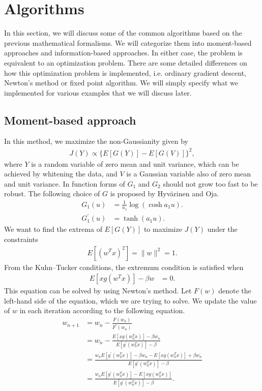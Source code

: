 \documentclass[aps,prl,preprint,superscriptaddress]{revtex4-2}
\begin{document}
\section{Algorithms}
In this section, we will discuss some of the common algorithms based on the previous mathematical formalisms. We will categorize them into moment-based approaches and information-based approaches. In either case, the problem is equivalent to an optimization problem. There are some detailed differences on how this optimization problem is implemented, i.e. ordinary gradient descent, Newton's method or fixed point algorithm. We will simply specify what we implemented for various examples that we will discuss later. 
\subsection{Moment-based approach}
In this method, we maximize the non-Gaussianity given by
\begin{align}
J(Y) \propto \{E[G(Y)] - E[G(V)]\}^2,
\end{align}
where $Y$ is a random variable of zero mean and unit variance, which can be achieved by whitening the data, and $V$ is a Gaussian variable also of zero mean and unit variance. In function forms of $G_1$ and $G_2$ should not grow too fast to be robust. The following choice of $G$ is proposed by Hyvärinen and Oja.
\begin{align}
G_1(u) &= \frac{1}{a_1} \log (\cosh a_1 u). \\
G_1^{\prime}(u) &= \tanh(a_1 u).
\end{align}
We want to find the extrema of $E[G(Y)]$ to maximize $J(Y)$ under the constraints
\begin{align}
E[(w^T x)^2] = \| w\|^2 = 1.
\end{align}
From the Kuhn--Tucker conditions, the extremum condition is satisfied when
\begin{align}
E[x g(w^Tx)] - \beta w &= 0.
\end{align}
This equation can be solved by using Newton's method.
Let $F(w)$ denote the left-hand side of the equation, which we are trying to solve.
We update the value of $w$ in each iteration according to the following equation.
\begin{align}
w_{n+1} &= w_n - \frac{F(w_n)}{F^{\prime}(w_n)} \\
&= w_n - \frac{E[x g (w_n^T x)] - \beta w_n}{E[g^{\prime}(w_n^T x)] - \beta} \\
&= \frac{w_n E[g^{\prime}(w_n^T x)] - \beta w_n - E[x g (w_n^T x)] + \beta w_n}{E[g^{\prime}(w_n^T x)] - \beta} \\
&= \frac{w_n E[g^{\prime}(w_n^T x)] - E[x g (w_n^T x)]}{E[g^{\prime}(w_n^T x)] - \beta}.
\end{align}
\end{document}
